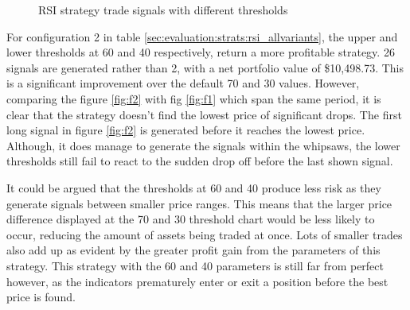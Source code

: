 \begin{figure}[ht]
  \centering
  \hfill
  \caption{RSI strategy trade signals with different thresholds}
  \label{fig:eval:strats:rsi_signals}
\end{figure}

For configuration 2 in table \ref{sec:evaluation:strats:rsi_allvariants}, the upper and lower thresholds at 60 and 40 respectively, return a more profitable strategy. 26 signals are generated rather than 2, with a net portfolio value of \$10,498.73. This is a significant improvement over the default 70 and 30 values. However, comparing the figure \ref{fig:f2} with fig \ref{fig:f1} which span the same period, it is clear that the strategy doesn't find the lowest price of significant drops. The first long signal in figure \ref{fig:f2} is generated before it reaches the lowest price. Although, it does manage to generate the signals within the whipsaws, the lower thresholds still fail to react to the sudden drop off before the last shown signal.

It could be argued that the thresholds at 60 and 40 produce less risk as they generate signals between smaller price ranges. This means that the larger price difference displayed at the 70 and 30 threshold chart would be less likely to occur, reducing the amount of assets being traded at once. Lots of smaller trades also add up as evident by the greater profit gain from the parameters of this strategy. This strategy with the 60 and 40 parameters is still far from perfect however, as the indicators prematurely enter or exit a position before the best price is found.


